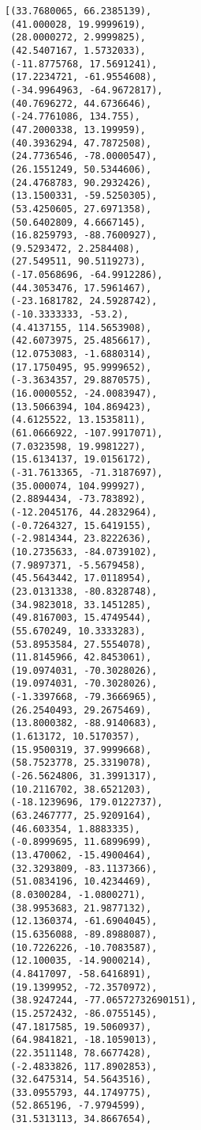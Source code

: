 \documentclass[11pt]{article}
\makeatletter
\newcommand{\boxspacing}{\kern\kvtcb@left@rule\kern\kvtcb@boxsep}
\newcommand{\prompt}[4]{
        \ttfamily\llap{{\color{#2}[#3]:\hspace{3pt}#4}}\vspace{-\baselineskip}
    }
\makeatother
\begin{document}
            \begin{tcolorbox}[breakable, size=fbox, boxrule=.5pt, pad at break*=1mm, opacityfill=0]
\prompt{Out}{outcolor}{95}{\boxspacing}
\begin{Verbatim}[commandchars=\\\{\}]
[(33.7680065, 66.2385139),
 (41.000028, 19.9999619),
 (28.0000272, 2.9999825),
 (42.5407167, 1.5732033),
 (-11.8775768, 17.5691241),
 (17.2234721, -61.9554608),
 (-34.9964963, -64.9672817),
 (40.7696272, 44.6736646),
 (-24.7761086, 134.755),
 (47.2000338, 13.199959),
 (40.3936294, 47.7872508),
 (24.7736546, -78.0000547),
 (26.1551249, 50.5344606),
 (24.4768783, 90.2932426),
 (13.1500331, -59.5250305),
 (53.4250605, 27.6971358),
 (50.6402809, 4.6667145),
 (16.8259793, -88.7600927),
 (9.5293472, 2.2584408),
 (27.549511, 90.5119273),
 (-17.0568696, -64.9912286),
 (44.3053476, 17.5961467),
 (-23.1681782, 24.5928742),
 (-10.3333333, -53.2),
 (4.4137155, 114.5653908),
 (42.6073975, 25.4856617),
 (12.0753083, -1.6880314),
 (17.1750495, 95.9999652),
 (-3.3634357, 29.8870575),
 (16.0000552, -24.0083947),
 (13.5066394, 104.869423),
 (4.6125522, 13.1535811),
 (61.0666922, -107.9917071),
 (7.0323598, 19.9981227),
 (15.6134137, 19.0156172),
 (-31.7613365, -71.3187697),
 (35.000074, 104.999927),
 (2.8894434, -73.783892),
 (-12.2045176, 44.2832964),
 (-0.7264327, 15.6419155),
 (-2.9814344, 23.8222636),
 (10.2735633, -84.0739102),
 (7.9897371, -5.5679458),
 (45.5643442, 17.0118954),
 (23.0131338, -80.8328748),
 (34.9823018, 33.1451285),
 (49.8167003, 15.4749544),
 (55.670249, 10.3333283),
 (53.8953584, 27.5554078),
 (11.8145966, 42.8453061),
 (19.0974031, -70.3028026),
 (19.0974031, -70.3028026),
 (-1.3397668, -79.3666965),
 (26.2540493, 29.2675469),
 (13.8000382, -88.9140683),
 (1.613172, 10.5170357),
 (15.9500319, 37.9999668),
 (58.7523778, 25.3319078),
 (-26.5624806, 31.3991317),
 (10.2116702, 38.6521203),
 (-18.1239696, 179.0122737),
 (63.2467777, 25.9209164),
 (46.603354, 1.8883335),
 (-0.8999695, 11.6899699),
 (13.470062, -15.4900464),
 (32.3293809, -83.1137366),
 (51.0834196, 10.4234469),
 (8.0300284, -1.0800271),
 (38.9953683, 21.9877132),
 (12.1360374, -61.6904045),
 (15.6356088, -89.8988087),
 (10.7226226, -10.7083587),
 (12.100035, -14.9000214),
 (4.8417097, -58.6416891),
 (19.1399952, -72.3570972),
 (38.9247244, -77.06572732690151),
 (15.2572432, -86.0755145),
 (47.1817585, 19.5060937),
 (64.9841821, -18.1059013),
 (22.3511148, 78.6677428),
 (-2.4833826, 117.8902853),
 (32.6475314, 54.5643516),
 (33.0955793, 44.1749775),
 (52.865196, -7.9794599),
 (31.5313113, 34.8667654),

\end{Verbatim}
\end{tcolorbox}
\end{document}
